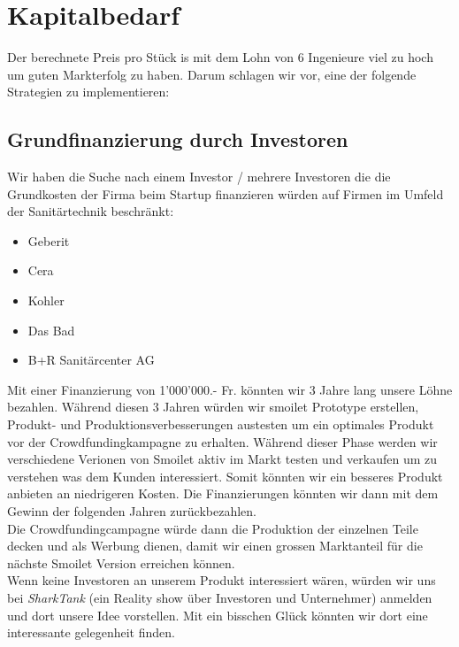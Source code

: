 \section{Kapitalbedarf}
Der berechnete Preis pro St\"uck is mit dem Lohn von 6 Ingenieure viel zu hoch um guten Markterfolg zu haben. Darum schlagen wir vor, eine der folgende Strategien zu implementieren:

\subsection{Grundfinanzierung durch Investoren}
Wir haben die Suche nach einem Investor / mehrere Investoren die die Grundkosten der Firma beim Startup finanzieren w\"urden auf Firmen im Umfeld der Sanit\"artechnik beschr\"ankt:
\begin{itemize}
\item Geberit
\item Cera
\item Kohler
\item Das Bad
\item B+R Sanit\"arcenter AG
\end{itemize}
Mit einer Finanzierung von 1'000'000.- Fr. k\"onnten wir 3 Jahre lang unsere L\"ohne bezahlen. W\"ahrend diesen 3 Jahren w\"urden wir smoilet Prototype erstellen, Produkt- und Produktionsverbesserungen austesten um ein optimales Produkt vor der Crowdfundingkampagne zu erhalten. W\"ahrend dieser Phase werden wir verschiedene Verionen von Smoilet aktiv im Markt testen und verkaufen um zu verstehen was dem Kunden interessiert. Somit k\"onnten wir ein besseres Produkt anbieten an niedrigeren Kosten. Die Finanzierungen k\"onnten wir dann mit dem Gewinn der folgenden Jahren zur\"uckbezahlen.\\
Die Crowdfundingcampagne w\"urde dann die Produktion der einzelnen Teile decken und als Werbung dienen, damit wir einen grossen Marktanteil f\"ur die n\"achste Smoilet Version erreichen k\"onnen. \\
Wenn keine Investoren an unserem Produkt interessiert w\"aren, w\"urden wir uns bei \textit{SharkTank} (ein Reality show \"uber Investoren und Unternehmer) anmelden und dort unsere Idee vorstellen. Mit ein bisschen Gl\"uck k\"onnten wir dort eine interessante gelegenheit finden.
